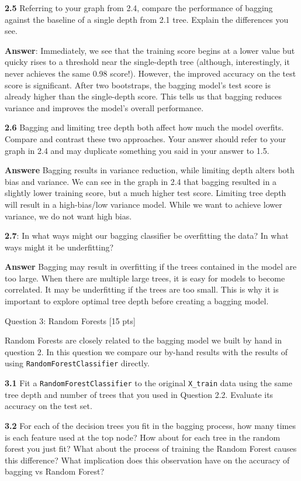 \documentclass[11pt]{article}
\begin{document}
    \textbf{2.5} Referring to your graph from 2.4, compare the performance
of bagging against the baseline of a single depth from 2.1 tree. Explain
the differences you see.

    \textbf{Answer}: Immediately, we see that the training score begins at a
lower value but quicky rises to a threshold near the single-depth tree
(although, interestingly, it never achieves the same 0.98 score!).
However, the improved accuracy on the test score is significant. After
two bootstraps, the bagging model's test score is already higher than
the single-depth score. This tells us that bagging reduces variance and
improves the model's overall performance.

    \textbf{2.6} Bagging and limiting tree depth both affect how much the
model overfits. Compare and contrast these two approaches. Your answer
should refer to your graph in 2.4 and may duplicate something you said
in your answer to 1.5.

\textbf{Answere} Bagging results in variance reduction, while limiting
depth alters both bias and variance. We can see in the graph in 2.4 that
bagging resulted in a slightly lower training score, but a much higher
test score. Limiting tree depth will result in a high-bias/low variance
model. While we want to achieve lower variance, we do not want high
bias.

    \textbf{2.7}: In what ways might our bagging classifier be overfitting
the data? In what ways might it be underfitting?

    \textbf{Answer} Bagging may result in overfitting if the trees contained
in the model are too large. When there are multiple large trees, it is
easy for models to become correlated. It may be underfitting if the
trees are too small. This is why it is important to explore optimal tree
depth before creating a bagging model.

     Question 3: Random Forests {[}15 pts{]}

Random Forests are closely related to the bagging model we built by hand
in question 2. In this question we compare our by-hand results with the
results of using \texttt{RandomForestClassifier} directly.

    \textbf{3.1} Fit a \texttt{RandomForestClassifier} to the original
\texttt{X\_train} data using the same tree depth and number of trees
that you used in Question 2.2. Evaluate its accuracy on the test set.

\textbf{3.2} For each of the decision trees you fit in the bagging
process, how many times is each feature used at the top node? How about
for each tree in the random forest you just fit? What about the process
of training the Random Forest causes this difference? What implication
does this observation have on the accuracy of bagging vs Random Forest?
\end{document}
